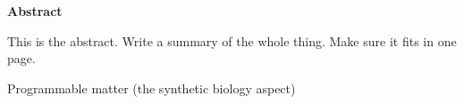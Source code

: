\newpage
{\Huge \bf Abstract}
\vspace{24pt} 

This is the abstract. Write a summary of the whole thing. Make 
sure it fits in one page. 

Programmable matter (the synthetic biology aspect)


\newpage
\vspace*{\fill}
